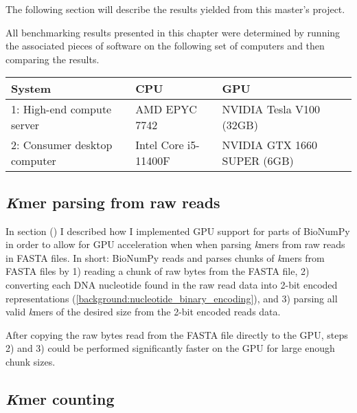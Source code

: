 The following section will describe the results yielded from this master's project.

All benchmarking results presented in this chapter were determined by running the associated pieces of software on the following set of computers and then comparing the results.

  \begin{tabular}{lll}
    \hline
      System                    & CPU                  & GPU                           \\
    \hline
      1: High-end compute server   & AMD EPYC 7742        & NVIDIA Tesla V100  (32GB)     \\
      2: Consumer desktop computer & Intel Core i5-11400F & NVIDIA GTX 1660 SUPER (6GB)   \\
    \hline
  \end{tabular}

\subsection{\textit{K}mer parsing from raw reads}
In section () I described how I implemented GPU support for parts of BioNumPy \cite{bionumpy} in order to allow for GPU acceleration when when parsing \textit{k}mers from raw reads in FASTA files.
In short: BioNumPy reads and parses chunks of \textit{k}mers from FASTA files by 
1) reading a chunk of raw bytes from the FASTA file, 
2) converting each DNA nucleotide found in the raw read data into 2-bit encoded representations (\ref{background:nucleotide_binary_encoding}), 
and 3) parsing all valid \textit{k}mers of the desired size from the 2-bit encoded reads data.

After copying the raw bytes read from the FASTA file directly to the GPU, steps 2) and 3) could be performed significantly faster on the GPU for large enough chunk sizes.

\subsection{\textit{K}mer counting}

